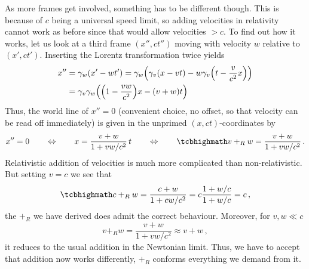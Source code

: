 \documentclass[../relativity_main.tex]{subfiles}
\begin{document}
As more frames get involved, something has to be different though. This is because of $c$ being a universal speed limit, so adding velocities in relativity cannot work as before since that would allow velocities $> c$. To find out how it works, let us look at a third frame $(x'', c t'')$ moving with velocity $w$ relative to $(x', c t')$. Inserting the Lorentz transformation twice yields
\begin{align*}
%
	x'' &= \gamma_w \qty(x' - w t') = \gamma_w \qty(\gamma_v (x - v t) - w \gamma_v \qty(t - \frac{v}{c^2} x))
	\notag\\
	&= \gamma_v \gamma_w \qty(\qty(1 - \frac{v w}{c^2}) x - (v + w) t)
\end{align*}
Thus, the world line of $x'' = 0$ (convenient choice, no offset, so that velocity can be read off immediately) is given in the unprimed $(x, ct)$-coordinates by
\begin{equation}\label{eq:velocity_addition_parallel}
	x'' = 0
	\qquad \Leftrightarrow \qquad
	x = \frac{v + w}{1 + v w / c^2} \, t
	\qquad \Leftrightarrow \qquad
	\eqbox{
	v +_R w = \frac{v + w}{1 + v w / c^2}
	} \, .
\end{equation}
Relativistic addition of velocities is much more complicated than non-relativistic. But setting $v = c$ we see that
\begin{equation}
	\eqbox{
	c +_R w = \frac{c + w}{1 + c w / c^2} = c \frac{1 + w / c}{1 + w / c} = c
	} \, ,
\end{equation}
the $+_R$ we have derived does admit the correct behaviour. Moreover, for $v, w \ll c$
\begin{equation}\label{eq:velocity_addition_limit}
	v +_R w = \frac{v + w}{1 + v w / c^2} \approx v + w \, ,
\end{equation}
it reduces to the usual addition in the Newtonian limit. Thus, we have to accept that addition now works differently, $+_R$ conforms everything we demand from it.\\
\end{document}
